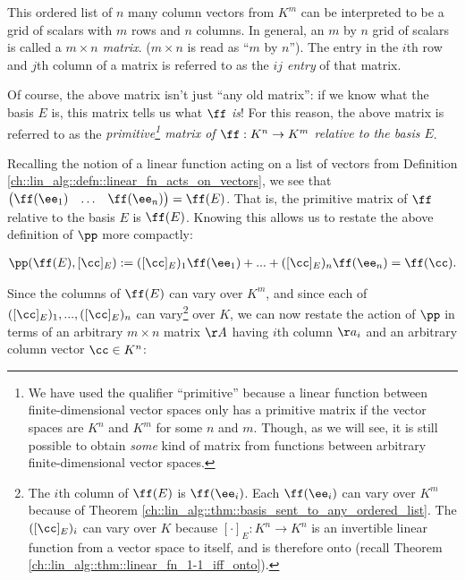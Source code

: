 \begin{deriv}
    This ordered list of $n$ many column vectors from $K^m$ can be interpreted to be a grid of scalars with $m$ rows and $n$ columns. In general, an $m$ by $n$ grid of scalars is called a \textit{$m \times n$ matrix}. ($m \times n$ is read as ``$m$ by $n$''). The entry in the $i$th row and $j$th column of a matrix is referred to as the \textit{$ij$ entry} of that matrix. 
    
    Of course, the above matrix isn't just ``any old matrix'': if we know what the basis $E$ is, this matrix tells us what $\ff$ \textit{is}! For this reason, the above matrix is referred to as the \textit{primitive\footnote{We have used the qualifier ``primitive'' because a linear function between finite-dimensional vector spaces only has a primitive matrix if the vector spaces are $K^n$ and $K^m$ for some $n$ and $m$. Though, as we will see, it is still possible to obtain \textit{some} kind of matrix from functions between arbitrary finite-dimensional vector spaces.} matrix of $\ff:K^n \rightarrow K^m$ relative to the basis $E$}.
    
    Recalling the notion of a linear function acting on a list of vectors from Definition \ref{ch::lin_alg::defn::linear_fn_acts_on_vectors}, we see that $\begin{pmatrix} \ff(\ee_1) & \hdots & \ff(\ee_n) \end{pmatrix} = \ff(E)$. That is, the primitive matrix of $\ff$ relative to the basis $E$ is $\ff(E)$. Knowing this allows us to restate the above definition of $\pp$ more compactly:
    
    \begin{align*}
        \pp(\ff(E), [\cc]_E) := ([\cc]_E)_1 \ff(\ee_1) + ... + ([\cc]_E)_n \ff(\ee_n) = \ff(\cc).
    \end{align*}
    
    Since the columns of $\ff(E)$ can vary over $K^m$, and since each of $([\cc]_E)_1, ..., ([\cc]_E)_n$ can vary\footnote{The $i$th column of $\ff(E)$ is $\ff(\ee_i)$. Each $\ff(\ee_i)$ can vary over $K^m$ because of Theorem \ref{ch::lin_alg::thm::basis_sent_to_any_ordered_list}. The $([\cc]_E)_i$ can vary over $K$ because $[\cdot]_E:K^n \rightarrow K^n$ is an invertible linear function from a vector space to itself, and is therefore onto (recall Theorem \ref{ch::lin_alg::thm::linear_fn_1-1_iff_onto}).} over $K$, we can now restate the action of $\pp$ in terms of an arbitrary $m \times n$ matrix $\AA$ having $i$th column $\aa_i$ and an arbitrary column vector $\cc \in K^n$:
    

\end{deriv}
